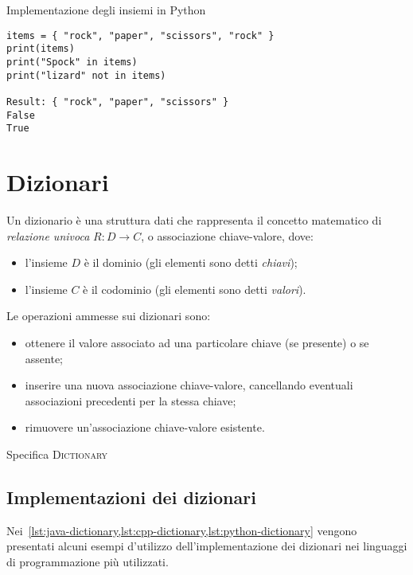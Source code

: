 \begin{listing}[H]
\caption{Implementazione degli insiemi in Python}%
\label{lst:python-set}
\begin{verbatim}
items = { "rock", "paper", "scissors", "rock" }
print(items)
print("Spock" in items)
print("lizard" not in items)

Result: { "rock", "paper", "scissors" }
False
True
\end{verbatim}
\end{listing}
\vspace{-10pt}

\section{Dizionari}

Un dizionario è una struttura dati che rappresenta il concetto matematico di \emph{relazione univoca} \(R : D \to C\), o associazione chiave-valore, dove:
\begin{itemize}
	\item l'insieme \(D\) è il dominio (gli elementi sono detti \emph{chiavi});
	\item l'insieme \(C\) è il codominio (gli elementi sono detti \emph{valori}).
\end{itemize}

Le operazioni ammesse sui dizionari sono:
\begin{itemize}
	\item ottenere il valore associato ad una particolare chiave (se presente) o \Nil se assente;
	\item inserire una nuova associazione chiave-valore, cancellando eventuali associazioni precedenti per la stessa chiave;
	\item rimuovere un'associazione chiave-valore esistente.
\end{itemize}

\begin{algorithm}[H]
	\caption[Specifica dizionario]{Specifica \textsc{Dictionary}}
	
\end{algorithm}

\subsection{Implementazioni dei dizionari}

Nei~\cref{lst:java-dictionary,lst:cpp-dictionary,lst:python-dictionary} vengono presentati alcuni esempi d'utilizzo dell'implementazione dei dizionari nei linguaggi di programmazione più utilizzati.

